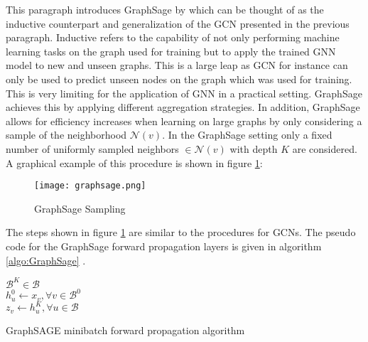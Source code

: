 	\noindent This paragraph introduces GraphSage by
	\cite{hamilton2017inductive} which can be thought of as the inductive 
	counterpart and generalization of the GCN presented in the previous paragraph. 
	Inductive refers to the capability of not only performing machine learning 
	tasks on the graph used for training but to apply the trained GNN model to 
	new and unseen graphs. This is a large leap as GCN for instance can only be 
	used to predict unseen nodes on the graph which was used for training. 
	This is very limiting for the application of GNN in a practical setting. 
	GraphSage achieves this by applying different aggregation strategies. 
	In addition, GraphSage allows for efficiency increases when learning on 
	large graphs by only considering a sample of the neighborhood 
	$\mathcal{N}(v)$. In the GraphSage setting only a fixed number of uniformly 
	sampled neighbors $\in\mathcal{N}(v)$ with depth $K$ are considered. 
	A graphical example of this procedure is shown in figure 
	\ref{fig:GraphSage_sample}:


	\begin{figure}[h]
		\centering
		\texttt{[image: graphsage.png]}
		\caption{GraphSage Sampling}
		\cite[p. 2]{hamilton2017inductive}
		\label{fig:GraphSage_sample}
	\end{figure}

	\noindent The steps shown in figure \ref{fig:GraphSage_sample} are similar
	to the procedures for GCNs. The pseudo code for the GraphSage forward 
	propagation layers is given in algorithm \ref{algo:GraphSage} 
	\cite[p. 12]{hamilton2017inductive}. \\


	\begin{algorithm}[h]
		\scriptsize
		\SetAlgoLined
		\nl $\mathcal{B}^{K}\in\mathcal{B}$\\
		\nl {}
		\nl $h_{u}^{0}\leftarrow x_{v},\forall v \in \mathcal{B}^{0}$\\
		\nl {}
		\nl $z_v \leftarrow h_{u}^{K},\forall u \in \mathcal{B}$
		\caption{GraphSAGE minibatch forward propagation algorithm}
		\label{algo:GraphSage}
	\end{algorithm}
	
